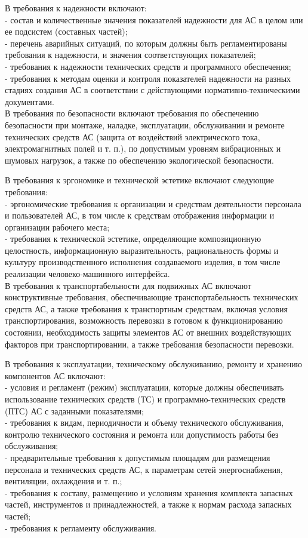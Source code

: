{В требования к надежности включают:\\
- состав и количественные значения показателей надежности для АС в целом или ее подсистем (составных частей);\\
- перечень аварийных ситуаций, по которым должны быть регламентированы требования к надежности, и значения соответствующих показателей; \\
- требования к надежности технических средств и программного обеспечения;\\
- требования к методам оценки и контроля показателей надежности на разных стадиях создания АС в соответствии с действующими нормативно-техническими документами.\\

В требования по безопасности включают требования по обеспечению безопасности при монтаже, наладке, эксплуатации, обслуживании и ремонте технических средств АС (защита от воздействий электрического тока, электромагнитных полей и т. п.), по допустимым уровням вибрационных и шумовых нагрузок, а также по обеспечению экологической безопасности.

В требования к эргономике и технической эстетике включают следующие требования:\\
- эргономические требования к организации и средствам деятельности персонала и пользователей АС, в том числе к средствам отображения информации и организации рабочего места;\\
- требования к технической эстетике, определяющие композиционную целостность, информационную выразительность, рациональность формы и культуру производственного исполнения создаваемого изделия, в том числе реализации человеко-машинного интерфейса.\\

В требования к транспортабельности для подвижных АС включают конструктивные требования, обеспечивающие транспортабельность технических средств АС, а также требования к транспортным средствам, включая условия транспортирования, возможность перевозки в готовом к функционированию состоянии, необходимость защиты элементов АС от внешних воздействующих факторов при транспортировании, а также требования безопасности перевозки.

В требования к эксплуатации, техническому обслуживанию, ремонту и хранению компонентов АС включают:\\
- условия и регламент (режим) эксплуатации, которые должны обеспечивать использование технических средств (ТС) и программно-технических средств (ПТС) АС с заданными показателями;\\
- требования к видам, периодичности и объему технического обслуживания, контролю технического состояния и ремонта или допустимость работы без обслуживания;\\
- предварительные требования к допустимым площадям для размещения персонала и технических средств АС, к параметрам сетей энергоснабжения, вентиляции, охлаждения и т. п.;\\
- требования к составу, размещению и условиям хранения комплекта запасных частей, инструментов и принадлежностей, а также к нормам расхода запасных частей;\\
- требования к регламенту обслуживания.\\

}
